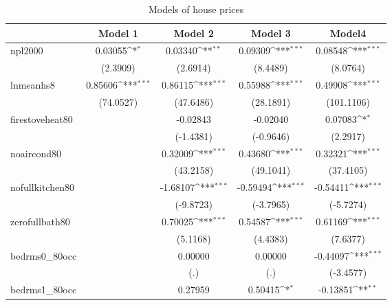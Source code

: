 \documentclass{article}
\begin{document}
{
\def\sym#1{\ifmmode^{#1}\else\(^{#1}\)\fi}
\begin{longtable}{l*{4}{c}}
\caption{Models of house prices}\\
\hline\hline\endfirsthead\hline\endhead\hline\endfoot\endlastfoot
                    &\multicolumn{1}{c}{Model 1}&\multicolumn{1}{c}{Model 2}&\multicolumn{1}{c}{Model 3}&\multicolumn{1}{c}{Model4}\\
\hline
npl2000             &     0.03055\sym{*}  &     0.03340\sym{**} &     0.09309\sym{***}&     0.08548\sym{***}\\
                    &    (2.3909)         &    (2.6914)         &    (8.4489)         &    (8.0764)         \\
[1em]
lnmeanhs8           &     0.85606\sym{***}&     0.86115\sym{***}&     0.55988\sym{***}&     0.49908\sym{***}\\
                    &   (74.0527)         &   (47.6486)         &   (28.1891)         &  (101.1106)         \\
[1em]
firestoveheat80     &                     &    -0.02843         &    -0.02040         &     0.07083\sym{*}  \\
                    &                     &   (-1.4381)         &   (-0.9646)         &    (2.2917)         \\
[1em]
noaircond80         &                     &     0.32009\sym{***}&     0.43680\sym{***}&     0.32321\sym{***}\\
                    &                     &   (43.2158)         &   (49.1041)         &   (37.4105)         \\
[1em]
nofullkitchen80     &                     &    -1.68107\sym{***}&    -0.59494\sym{***}&    -0.54411\sym{***}\\
                    &                     &   (-9.8723)         &   (-3.7965)         &   (-5.7274)         \\
[1em]
zerofullbath80      &                     &     0.70025\sym{***}&     0.54587\sym{***}&     0.61169\sym{***}\\
                    &                     &    (5.1168)         &    (4.4383)         &    (7.6377)         \\
[1em]
bedrms0\_80occ       &                     &     0.00000         &     0.00000         &    -0.44097\sym{***}\\
                    &                     &         (.)         &         (.)         &   (-3.4577)         \\
[1em]
bedrms1\_80occ       &                     &     0.27959         &     0.50415\sym{*}  &    -0.13851\sym{**} \\

\end{longtable}}
\end{document}
